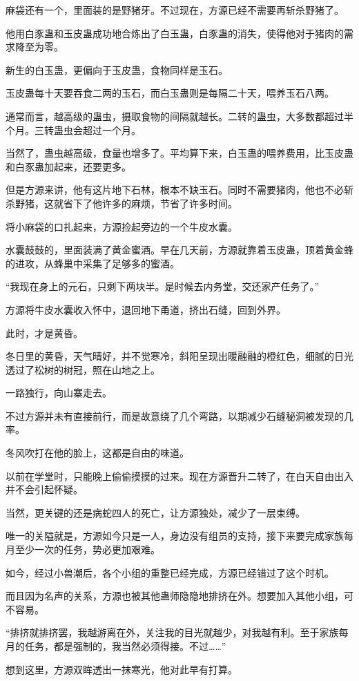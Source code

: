\begin{this_body}
麻袋还有一个，里面装的是野猪牙。不过现在，方源已经不需要再斩杀野猪了。

他用白豕蛊和玉皮蛊成功地合炼出了白玉蛊，白豕蛊的消失，使得他对于猪肉的需求降至为零。

新生的白玉蛊，更偏向于玉皮蛊，食物同样是玉石。

玉皮蛊每十天要吞食二两的玉石，而白玉蛊则是每隔二十天，喂养玉石八两。

通常而言，越高级的蛊虫，摄取食物的间隔就越长。二转的蛊虫，大多数都超过半个月。三转蛊虫会超过一个月。

当然了，蛊虫越高级，食量也增多了。平均算下来，白玉蛊的喂养费用，比玉皮蛊和白豕蛊加起来，还要更多。

但是方源来讲，他有这片地下石林，根本不缺玉石。同时不需要猪肉，他也不必斩杀野猪，这就省下了他许多的麻烦，节省了许多时间。

将小麻袋的口扎起来，方源捡起旁边的一个牛皮水囊。

水囊鼓鼓的，里面装满了黄金蜜酒。早在几天前，方源就靠着玉皮蛊，顶着黄金蜂的进攻，从蜂巢中采集了足够多的蜜酒。

“我现在身上的元石，只剩下两块半。是时候去内务堂，交还家产任务了。”

方源将牛皮水囊收入怀中，退回地下甬道，挤出石缝，回到外界。

此时，才是黄昏。

冬日里的黄昏，天气晴好，并不觉寒冷，斜阳呈现出暖融融的橙红色，细腻的日光透过了松树的树冠，照在山地之上。

一路独行，向山寨走去。

不过方源并未有直接前行，而是故意绕了几个弯路，以期减少石缝秘洞被发现的几率。

冬风吹打在他的脸上，这都是自由的味道。

以前在学堂时，只能晚上偷偷摸摸的过来。现在方源晋升二转了，在白天自由出入并不会引起怀疑。

当然，更关键的还是病蛇四人的死亡，让方源独处，减少了一层束缚。

唯一的关隘就是，方源如今只是一人，身边没有组员的支持，接下来要完成家族每月至少一次的任务，势必更加艰难。

如今，经过小兽潮后，各个小组的重整已经完成，方源已经错过了这个时机。

而且因为名声的关系，方源也被其他蛊师隐隐地排挤在外。想要加入其他小组，可不容易。

“排挤就排挤罢，我越游离在外，关注我的目光就越少，对我越有利。至于家族每月的任务，都是强制的，我当然必须得接。不过……”

想到这里，方源双眸透出一抹寒光，他对此早有打算。


\end{this_body}

